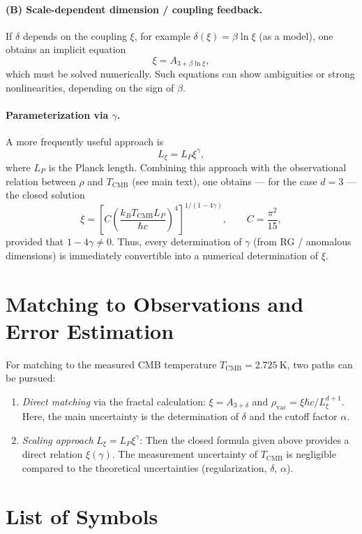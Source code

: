 	\paragraph{(B) Scale-dependent dimension / coupling feedback.} If \(\delta\) depends on the coupling \(\xi\), for example \(\delta(\xi)=\beta\ln\xi\) (as a model), one obtains an implicit equation
	\[
	\xi = A_{3+\beta\ln\xi},
	\]
	which must be solved numerically. Such equations can show ambiguities or strong nonlinearities, depending on the sign of \(\beta\).
	
	\paragraph{Parameterization via \(\gamma\).} A more frequently useful approach is
	\[
	L_\xi = L_P\xi^{\gamma},
	\]
	where \(L_P\) is the Planck length. Combining this approach with the observational relation between \(\rho\) and \(T_{\mathrm{CMB}}\) (see main text), one obtains — for the case \(d=3\) — the closed solution
	\[
	\xi = \left[ C \left(\frac{k_B T_{\mathrm{CMB}} L_P}{\hbar c}\right)^4 \right]^{1/(1-4\gamma)},\qquad C=\frac{\pi^2}{15},
	\]
	provided that \(1-4\gamma\neq 0\). Thus, every determination of \(\gamma\) (from RG / anomalous dimensions) is immediately convertible into a numerical determination of \(\xi\).
	
	\section{Matching to Observations and Error Estimation}
	For matching to the measured CMB temperature \(T_{\mathrm{CMB}}=2.725\ \mathrm{K}\), two paths can be pursued:
	\begin{enumerate}
		\item \emph{Direct matching} via the fractal calculation: \(\xi=A_{3+\delta}\) and \(\rho_{\mathrm{vac}}=\xi\hbar c/L_\xi^{d+1}\). Here, the main uncertainty is the determination of \(\delta\) and the cutoff factor \(\alpha\).
		\item \emph{Scaling approach} \(L_\xi=L_P\xi^\gamma\): Then the closed formula given above provides a direct relation \(\xi(\gamma)\). The measurement uncertainty of \(T_{\mathrm{CMB}}\) is negligible compared to the theoretical uncertainties (regularization, \(\delta\), \(\alpha\)).
	\end{enumerate}
	
	\section{List of Symbols}
	\label{sec:notation}
	
